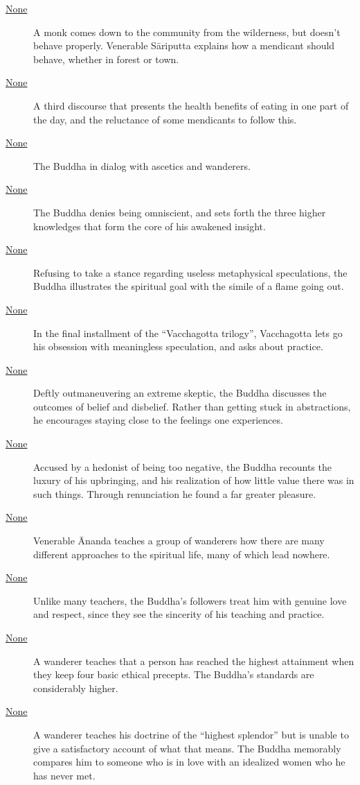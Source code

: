 \documentclass[12pt,openany]{book}%
\begin{document}
\begin{description}
\item[\href{\#mn69}{None}] A monk comes down to the community from the wilderness, but doesn’t behave properly. Venerable \textsanskrit{Sāriputta} explains how a mendicant should behave, whether in forest or town.%
\item[\href{\#mn70}{None}] A third discourse that presents the health benefits of eating in one part of the day, and the reluctance of some mendicants to follow this.%
\item[\href{\#mn{-}paribbajakavagga}{None}] The Buddha in dialog with ascetics and wanderers.%
\item[\href{\#mn71}{None}] The Buddha denies being omniscient, and sets forth the three higher knowledges that form the core of his awakened insight.%
\item[\href{\#mn72}{None}] Refusing to take a stance regarding useless metaphysical speculations, the Buddha illustrates the spiritual goal with the simile of a flame going out.%
\item[\href{\#mn73}{None}] In the final installment of the “Vacchagotta trilogy”, Vacchagotta lets go his obsession with meaningless speculation, and asks about practice.%
\item[\href{\#mn74}{None}] Deftly outmaneuvering an extreme skeptic, the Buddha discusses the outcomes of belief and disbelief. Rather than getting stuck in abstractions, he encourages staying close to the feelings one experiences.%
\item[\href{\#mn75}{None}] Accused by a hedonist of being too negative, the Buddha recounts the luxury of his upbringing, and his realization of how little value there was in such things. Through renunciation he found a far greater pleasure.%
\item[\href{\#mn76}{None}] Venerable Ānanda teaches a group of wanderers how there are many different approaches to the spiritual life, many of which lead nowhere.%
\item[\href{\#mn77}{None}] Unlike many teachers, the Buddha’s followers treat him with genuine love and respect, since they see the sincerity of his teaching and practice.%
\item[\href{\#mn78}{None}] A wanderer teaches that a person has reached the highest attainment when they keep four basic ethical precepts. The Buddha’s standards are considerably higher.%
\item[\href{\#mn79}{None}] A wanderer teaches his doctrine of the “highest splendor” but is unable to give a satisfactory account of what that means. The Buddha memorably compares him to someone who is in love with an idealized women who he has never met.%

\end{description}
\end{document}
